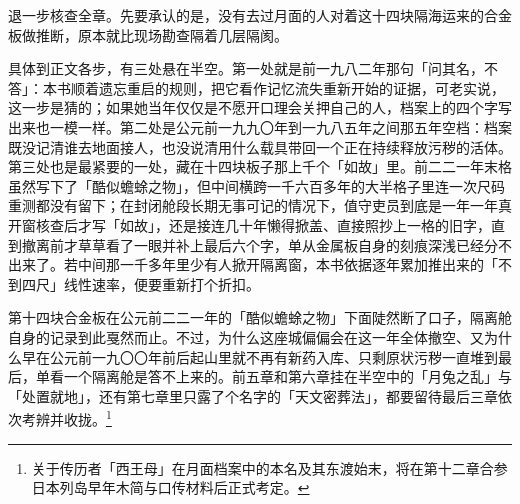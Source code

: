 退一步核查全章。先要承认的是，没有去过月面的人对着这十四块隔海运来的合金板做推断，原本就比现场勘查隔着几层隔阂。

具体到正文各步，有三处悬在半空。第一处就是前一九八二年那句「问其名，不答」：本书顺着遗忘重启的规则，把它看作记忆流失重新开始的证据，可老实说，这一步是猜的；如果她当年仅仅是不愿开口理会关押自己的人，档案上的四个字写出来也一模一样。第二处是公元前一九九〇年到一九八五年之间那五年空档：档案既没记清谁去地面接人，也没说清用什么载具带回一个正在持续释放污秽的活体。第三处也是最紧要的一处，藏在十四块板子那上千个「如故」里。前二二一年末格虽然写下了「酷似蟾蜍之物」，但中间横跨一千六百多年的大半格子里连一次尺码重测都没有留下；在封闭舱段长期无事可记的情况下，值守吏员到底是一年一年真开窗核查后才写「如故」，还是接连几十年懒得掀盖、直接照抄上一格的旧字，直到撤离前才草草看了一眼并补上最后六个字，单从金属板自身的刻痕深浅已经分不出来了。若中间那一千多年里少有人掀开隔离窗，本书依据逐年累加推出来的「不到四尺」线性速率，便要重新打个折扣。

第十四块合金板在公元前二二一年的「酷似蟾蜍之物」下面陡然断了口子，隔离舱自身的记录到此戛然而止。不过，为什么这座城偏偏会在这一年全体撤空、又为什么早在公元前一九〇〇年前后起山里就不再有新药入库、只剩原状污秽一直堆到最后，单看一个隔离舱是答不上来的。前五章和第六章挂在半空中的「月兔之乱」与「处置就地」，还有第七章里只露了个名字的「天文密葬法」，都要留待最后三章依次考辨并收拢。\footnote{关于传历者「西王母」在月面档案中的本名及其东渡始末，将在第十二章合参日本列岛早年木简与口传材料后正式考定。}
